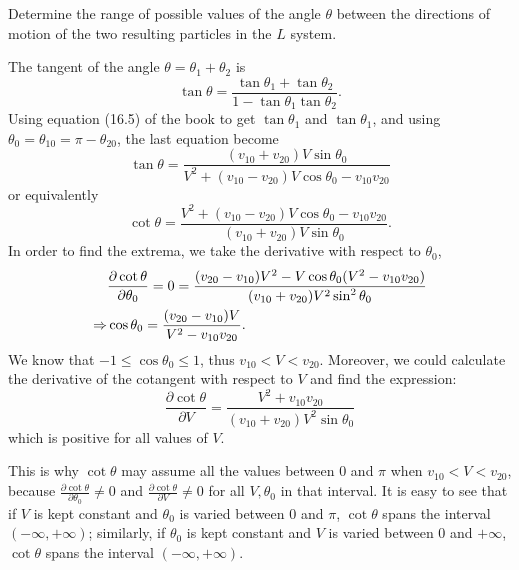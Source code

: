 \begin{problem}
{
Determine the range of possible values of the angle $\theta$ between the directions of motion of the two resulting particles in the $L$ system.
}
{
The tangent of the angle $\theta = \theta_1 + \theta_2$ is
\begin{equation*}
    \tan{\theta} = \frac{\tan{\theta_1} + \tan{\theta_2}}{1 - \tan{\theta_1}\tan{\theta_2}}.
\end{equation*}
Using equation (16.5) of the book to get $\tan{\theta_1}$ and $\tan{\theta_1}$, and using $\theta_0 = \theta_{10} = \pi - \theta_{20}$, the last equation become
\begin{equation*}
    \tan{\theta} = \frac{(v_{10}+v_{20})V\sin{\theta_0}}{V^2+(v_{10}-v_{20})V\cos{\theta_0} - v_{10}v_{20}}
\end{equation*}
or equivalently
\begin{equation*}
    \cot{\theta} = \frac{V^2+(v_{10}-v_{20})V\cos{\theta_0} - v_{10}v_{20}}{(v_{10}+v_{20})V\sin{\theta_0}}.
\end{equation*}
In order to find the extrema, we take the derivative with respect to $\theta_0$,
\begin{align*}
    &\frac{\partial \cot{\theta}}{\partial \theta_0} = 0 = \frac{(v_{20}-v_{10})V^2 - V\cos{\theta_0}(V^2-v_{10}v_{20})}{(v_{10}+v_{20})V^2\sin^2{\theta_0}}\\
    \Rightarrow &\cos{\theta_0} = \frac{(v_{20}-v_{10})V}{V^2-v_{10}v_{20}}.
\end{align*}
We know that $-1 \leq \cos{\theta_0} \leq 1$, thus $v_{10} < V < v_{20}$. Moreover, we could calculate the derivative of the cotangent with respect to $ V $ and find the expression:
\begin{equation*}
    \frac{\partial \cot{\theta}}{\partial V} = \frac{V^2 + v_{10}v_{20}}{(v_{10}+v_{20})V^2 \sin{\theta_0}}
\end{equation*}
which is positive for all values of $ V $.

This is why $ \cot{\theta} $ may assume all the values between 0 and $ \pi $ when $ v_{10} < V < v_{20} $, because $ \frac{\partial \cot{\theta}}{\partial \theta_0} \neq 0 $ and $ \frac{\partial \cot{\theta}}{\partial V} \neq 0 $ for all $ V, \theta_0 $ in that interval. It is easy to see that if $ V $ is kept constant and $ \theta_0 $ is varied between 0 and $ \pi $, $ \cot{\theta} $ spans the interval $ (-\infty, +\infty) $; similarly, if $ \theta_0 $ is kept constant and $ V $ is varied between 0 and $ +\infty $, $ \cot{\theta} $ spans the interval $ (-\infty, +\infty) $.

}
\end{problem}
